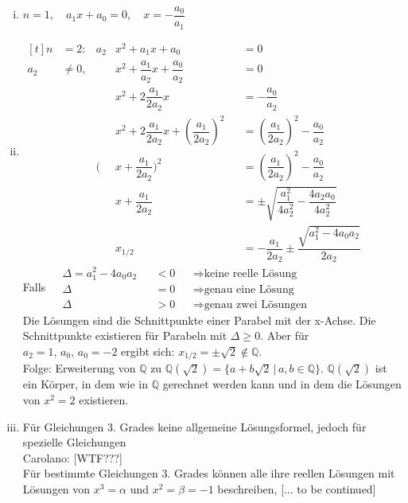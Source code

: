 \documentclass{article}
\begin{document}
\begin{enumerate}[(i)]
    \item $n=1,\quad a_{1}x+a_{0}=0,\quad x=-\dfrac{a_{0}}{a_{1}}$
    \item $\begin{aligned}[t]
        n&=2: & a_{2}&x^{2}+a_{1}x+a_{0} & &=0\\
        a_{2}&\neq 0, & &x^{2}+\dfrac{a_{1}}{a_{2}}x+\dfrac{a_{0}}{a_{2}} & &= 0\\
        & & &x^{2}+2\dfrac{a_{1}}{2a_{2}}x & &= - \dfrac{a_{0}}{a_{2}}\\
        & & &x^{2}+2\dfrac{a_{1}}{2a_{2}}x +(\dfrac{a_{1}}{2a_{2}})^2 & &= (\dfrac{a_{1}}{2a_{2}})^2 - \dfrac{a_{0}}{a_{2}}\\
        & & (&x+\dfrac{a_{1}}{2a_{2}})^2 & &= (\dfrac{a_{1}}{2a_{2}})^2 - \dfrac{a_{0}}{a_{2}}\\
        & & &x+\dfrac{a_{1}}{2a_{2}} & &=\pm\sqrt{\dfrac{a_{1}^{2}}{4a_{2}^{2}} - \dfrac{4a_{2}a_{0}}{4a_{2}^{2}}}\\
        & & &x_{1/2} & &=-\dfrac{a_{1}}{2a_{2}}\pm\dfrac{\sqrt{a_{1}^{2}-4a_{0}a_{2}}}{2a_{2}}
        \end{aligned}$\\
        Falls $\begin{aligned}
            &\Delta = a_{1}^{2}-4a_{0}a_{2} & &< 0 & &\Rightarrow \text{keine reelle Lösung}\\
            &\Delta & &=0 & &\Rightarrow \text{genau eine Lösung}\\
            &\Delta & &> 0 & &\Rightarrow \text{genau zwei Lösungen}
        \end{aligned}$\\
        Die Lösungen sind die Schnittpunkte einer Parabel mit der x-Achse. Die Schnittpunkte existieren für Parabeln mit $\Delta \geq 0$.
        Aber für ${a_{2}=1,\,a_{0},\,a_{0}=-2}$ ergibt sich: $x_{1/2} = \pm \sqrt{2}\notin \mathbb{Q}$.\\
        Folge: Erweiterung von $\mathbb{Q}$ zu $\mathbb{Q}(\sqrt{2})=\{a + b\sqrt{2}\,|\,a,b\in\mathbb{Q}\}$.
        $\mathbb{Q}(\sqrt{2})$ ist ein Körper, in dem wie in $\mathbb{Q}$ gerechnet werden kann und in dem die Lösungen von $x^{2}=2$ existieren.

    \item Für Gleichungen 3. Grades keine allgemeine Lösungsformel, jedoch für spezielle Gleichungen\\
        Carolano: [WTF???] \\
        Für bestimmte Gleichungen 3. Grades können alle ihre reellen Lösungen mit Lösungen von $x^{3}=\alpha$ und $x^{2}=\beta=-1$ beschreiben, [... to be continued]
\end{enumerate}
\end{document}
